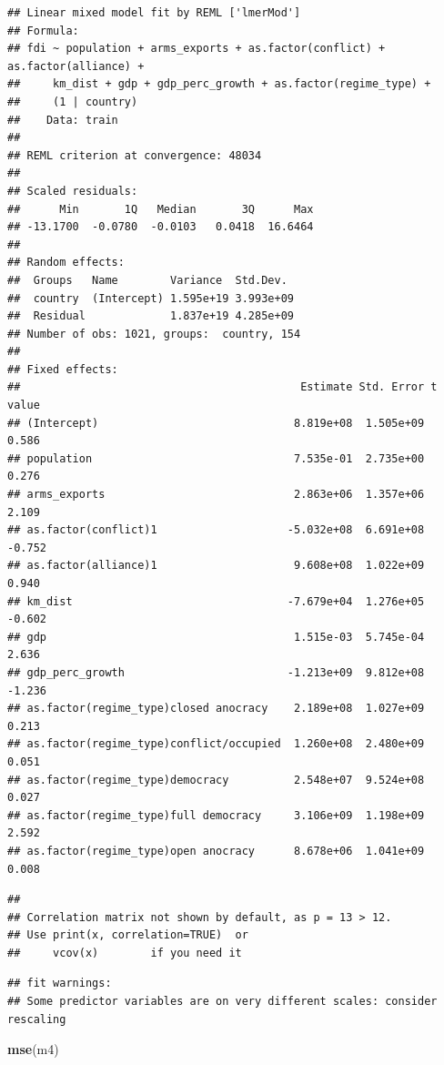 \documentclass[11pt,]{article}
\newenvironment{Shaded}{\begin{snugshade}}{\end{snugshade}}
\newcommand{\KeywordTok}[1]{\textcolor[rgb]{0.13,0.29,0.53}{\textbf{#1}}}
\newcommand{\NormalTok}[1]{#1}
\begin{document}
\begin{verbatim}
## Linear mixed model fit by REML ['lmerMod']
## Formula: 
## fdi ~ population + arms_exports + as.factor(conflict) + as.factor(alliance) +  
##     km_dist + gdp + gdp_perc_growth + as.factor(regime_type) +  
##     (1 | country)
##    Data: train
## 
## REML criterion at convergence: 48034
## 
## Scaled residuals: 
##      Min       1Q   Median       3Q      Max 
## -13.1700  -0.0780  -0.0103   0.0418  16.6464 
## 
## Random effects:
##  Groups   Name        Variance  Std.Dev. 
##  country  (Intercept) 1.595e+19 3.993e+09
##  Residual             1.837e+19 4.285e+09
## Number of obs: 1021, groups:  country, 154
## 
## Fixed effects:
##                                           Estimate Std. Error t value
## (Intercept)                              8.819e+08  1.505e+09   0.586
## population                               7.535e-01  2.735e+00   0.276
## arms_exports                             2.863e+06  1.357e+06   2.109
## as.factor(conflict)1                    -5.032e+08  6.691e+08  -0.752
## as.factor(alliance)1                     9.608e+08  1.022e+09   0.940
## km_dist                                 -7.679e+04  1.276e+05  -0.602
## gdp                                      1.515e-03  5.745e-04   2.636
## gdp_perc_growth                         -1.213e+09  9.812e+08  -1.236
## as.factor(regime_type)closed anocracy    2.189e+08  1.027e+09   0.213
## as.factor(regime_type)conflict/occupied  1.260e+08  2.480e+09   0.051
## as.factor(regime_type)democracy          2.548e+07  9.524e+08   0.027
## as.factor(regime_type)full democracy     3.106e+09  1.198e+09   2.592
## as.factor(regime_type)open anocracy      8.678e+06  1.041e+09   0.008
\end{verbatim}

\begin{verbatim}
## 
## Correlation matrix not shown by default, as p = 13 > 12.
## Use print(x, correlation=TRUE)  or
##     vcov(x)        if you need it
\end{verbatim}

\begin{verbatim}
## fit warnings:
## Some predictor variables are on very different scales: consider rescaling
\end{verbatim}

\begin{Shaded}
\begin{Highlighting}[]
\KeywordTok{mse}\NormalTok{(m4)}
\end{Highlighting}
\end{Shaded}
\end{document}
